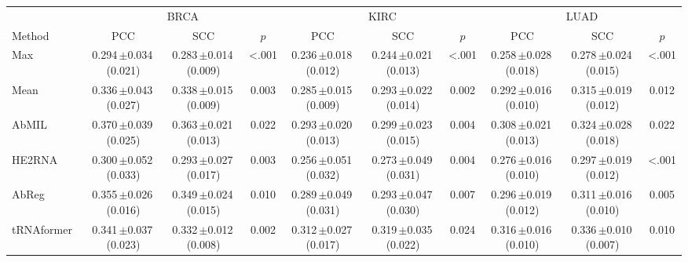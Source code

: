 \begin{tabular}{lccccccccc}
\toprule
& \multicolumn{3}{c}{BRCA} & \multicolumn{3}{c}{KIRC} & \multicolumn{3}{c}{LUAD}\\
\cmidrule(lr){2-4}\cmidrule(lr){5-7}\cmidrule(lr){8-10}
Method & PCC & SCC & $p$ & PCC & SCC & $p$ & PCC & SCC & $p$\\
\midrule
Max~\citep{wang2018revisiting} & 0.294\,{\tiny$\pm$}0.034\,{\tiny(0.021)} & 0.283\,{\tiny$\pm$}0.014\,{\tiny(0.009)} & \textless.001 & 0.236\,{\tiny$\pm$}0.018\,{\tiny(0.012)} & 0.244\,{\tiny$\pm$}0.021\,{\tiny(0.013)} & \textless.001 & 0.258\,{\tiny$\pm$}0.028\,{\tiny(0.018)} & 0.278\,{\tiny$\pm$}0.024\,{\tiny(0.015)} & \textless.001\\
Mean~\citep{wang2018revisiting} & 0.336\,{\tiny$\pm$}0.043\,{\tiny(0.027)} & 0.338\,{\tiny$\pm$}0.015\,{\tiny(0.009)} & 0.003 & 0.285\,{\tiny$\pm$}0.015\,{\tiny(0.009)} & 0.293\,{\tiny$\pm$}0.022\,{\tiny(0.014)} & 0.002 & 0.292\,{\tiny$\pm$}0.016\,{\tiny(0.010)} & 0.315\,{\tiny$\pm$}0.019\,{\tiny(0.012)} & 0.012\\
AbMIL~\citep{ilse2018abmil} & 0.370\,{\tiny$\pm$}0.039\,{\tiny(0.025)} & 0.363\,{\tiny$\pm$}0.021\,{\tiny(0.013)} & 0.022 & 0.293\,{\tiny$\pm$}0.020\,{\tiny(0.013)} & 0.299\,{\tiny$\pm$}0.023\,{\tiny(0.015)} & 0.004 & 0.308\,{\tiny$\pm$}0.021\,{\tiny(0.013)} & 0.324\,{\tiny$\pm$}0.028\,{\tiny(0.018)} & 0.022\\
HE2RNA~\citep{schmauch2020he2rna} & 0.300\,{\tiny$\pm$}0.052\,{\tiny(0.033)} & 0.293\,{\tiny$\pm$}0.027\,{\tiny(0.017)} & 0.003 & 0.256\,{\tiny$\pm$}0.051\,{\tiny(0.032)} & 0.273\,{\tiny$\pm$}0.049\,{\tiny(0.031)} & 0.004 & 0.276\,{\tiny$\pm$}0.016\,{\tiny(0.010)} & 0.297\,{\tiny$\pm$}0.019\,{\tiny(0.012)} & \textless.001\\
AbReg~\citep{graziani2022abreg} & 0.355\,{\tiny$\pm$}0.026\,{\tiny(0.016)} & 0.349\,{\tiny$\pm$}0.024\,{\tiny(0.015)} & 0.010 & 0.289\,{\tiny$\pm$}0.049\,{\tiny(0.031)} & 0.293\,{\tiny$\pm$}0.047\,{\tiny(0.030)} & 0.007 & 0.296\,{\tiny$\pm$}0.019\,{\tiny(0.012)} & 0.311\,{\tiny$\pm$}0.016\,{\tiny(0.010)} & 0.005\\
tRNAformer~\citep{alsaafin2022trnaformer} & 0.341\,{\tiny$\pm$}0.037\,{\tiny(0.023)} & 0.332\,{\tiny$\pm$}0.012\,{\tiny(0.008)} & 0.002 & 0.312\,{\tiny$\pm$}0.027\,{\tiny(0.017)} & 0.319\,{\tiny$\pm$}0.035\,{\tiny(0.022)} & 0.024 & 0.316\,{\tiny$\pm$}0.016\,{\tiny(0.010)} & 0.336\,{\tiny$\pm$}0.010\,{\tiny(0.007)} & 0.010\\

\end{tabular}
